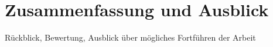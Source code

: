 \chapter{Zusammenfassung und Ausblick}
\label{schluss}

Rückblick, Bewertung, Ausblick über mögliches Fortführen der Arbeit
